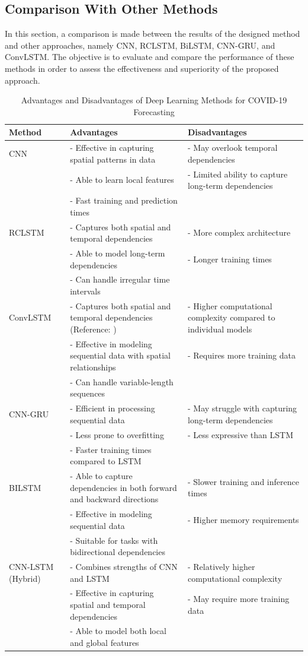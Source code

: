 \documentclass{article}
\begin{document}
\subsection{Comparison With Other Methods}
In this section, a comparison is made between the results of the designed method and other approaches, namely CNN, RCLSTM, BiLSTM, CNN-GRU, and ConvLSTM. The objective is to evaluate and compare the performance of these methods in order to assess the effectiveness and superiority of the proposed approach.
\begin{table}[h]
\caption{Advantages and Disadvantages of Deep Learning Methods for COVID-19 Forecasting}
\centering
\begin{tabular}{lp{6cm}p{6cm}}
\hline
Method & Advantages & Disadvantages \\
\hline
CNN & 
- Effective in capturing spatial patterns in data  & 
- May overlook temporal dependencies   \\
& - Able to learn local features & 
- Limited ability to capture long-term dependencies \cite{han2022survey} \\
& - Fast training and prediction times & \\
\hline
RCLSTM & 
- Captures both spatial and temporal dependencies & 
- More complex architecture \\
& - Able to model long-term dependencies & 
- Longer training times \\
& - Can handle irregular time intervals & \\
\hline
ConvLSTM & 
- Captures both spatial and temporal dependencies (Reference: ) & 
- Higher computational complexity compared to individual models \\
& - Effective in modeling sequential data with spatial relationships & 
- Requires more training data\cite{rahman2019deep} \\
& - Can handle variable-length sequences & \\
\hline
CNN-GRU & 
- Efficient in processing sequential data  & 
- May struggle with capturing long-term dependencies \\
& - Less prone to overfitting & 
- Less expressive than LSTM \cite{shah2021deep} \\
& - Faster training times compared to LSTM & \\
\hline
BILSTM & 
- Able to capture dependencies in both forward and backward directions & 
- Slower training and inference times \\
& - Effective in modeling sequential data & 
- Higher memory requirements\cite{wozniak2023bilstm} \\
& - Suitable for tasks with bidirectional dependencies & \\
\hline
CNN-LSTM (Hybrid) & 
- Combines strengths of CNN and LSTM   & 
- Relatively higher computational complexity \\
& - Effective in capturing spatial and temporal dependencies & 
- May require more training data\cite{lindemann2021survey} \\
& - Able to model both local and global features & \\
\hline
\end{tabular}
\label{tab:advantages_disadvantages}
\end{table}
\end{document}
